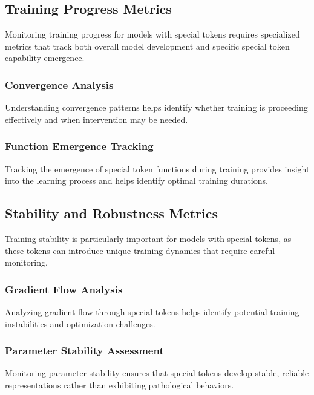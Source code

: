 \subsection{Training Progress Metrics}

Monitoring training progress for models with special tokens requires specialized metrics that track both overall model development and specific special token capability emergence.

\subsubsection{Convergence Analysis}

Understanding convergence patterns helps identify whether training is proceeding effectively and when intervention may be needed.

\subsubsection{Function Emergence Tracking}

Tracking the emergence of special token functions during training provides insight into the learning process and helps identify optimal training durations.

\subsection{Stability and Robustness Metrics}

Training stability is particularly important for models with special tokens, as these tokens can introduce unique training dynamics that require careful monitoring.

\subsubsection{Gradient Flow Analysis}

Analyzing gradient flow through special tokens helps identify potential training instabilities and optimization challenges.

\subsubsection{Parameter Stability Assessment}

Monitoring parameter stability ensures that special tokens develop stable, reliable representations rather than exhibiting pathological behaviors.

